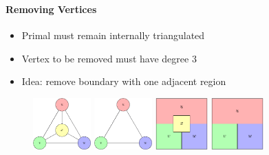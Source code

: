 \documentclass[t,18pt]{beamer}
\begin{document}
\begin{frame}
  \frametitle{}
  \framesubtitle{Removing Vertices}
  \begin{itemize}
    \item Primal must remain internally triangulated
    \item Vertex to be removed must have degree 3
    \item Idea: remove boundary with one adjacent region
  \end{itemize}
  \begin{figure}
    \includegraphics[height=2cm]{../Thesis/Resources/RemoveVertex-Example-Internal-1.pdf}
    \quad
    \includegraphics[height=2cm]{../Thesis/Resources/RemoveVertex-Example-Internal-2.pdf}
    \quad
    \includegraphics[height=2cm]{../Thesis/Resources/RemoveVertex-Example-Internal-3.pdf}
    \quad
    \includegraphics[height=2cm]{../Thesis/Resources/RemoveVertex-Example-Internal-4.pdf}
  \end{figure}
\end{frame}
\end{document}
